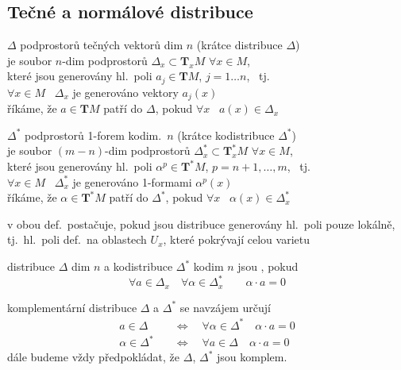 \subsection{Tečné a normálové distribuce}

\begin{definice}[Distribuce]
 $\Delta$ podprostorů tečných vektorů dim $n$ (krátce distribuce $\Delta$) \\
je soubor $n$-dim podprostorů $\Delta_x\subset\mathbf{T}_xM$ $\forall x\in M$, \\
které jsou generovány hl.\ poli $a_j\in\mathbf{T}M$, $j = 1\dots n$, \ tj.\ \\
\quad $\forall x\in M$ \ $\Delta_x$ je generováno vektory $a_j(x)$ \\
říkáme, že $a\in\mathbf{T}M$ patří do $\Delta$, pokud $\forall x$ \ $a(x)\in\Delta_x$
\end{definice}

\begin{definice}[Kodistribuce]
 $\Delta^*$ podprostorů 1-forem kodim.\ $n$ (krátce kodistribuce $\Delta^*$) \\
je soubor $(m-n)$-dim podprostorů $\Delta^*_x\subset\mathbf{T}^*_xM$ $\forall x\in M$, \\
které jsou generovány hl.\ poli $\alpha^{p}\in\mathbf{T}^*M$, $p = n+1,\dots,m$, \ tj.\ \\
\quad $\forall x\in M$ \ $\Delta^*_x$ je generováno 1-formami $\alpha^{p}(x)$ \\
říkáme, že $\alpha\in\mathbf{T}^*M$ patří do $\Delta^*$, pokud $\forall x$ \ $\alpha(x)\in\Delta^*_x$
\end{definice}
v obou def.\ postačuje, pokud jsou distribuce generovány hl.\ poli pouze lokálně, tj.\ hl.\ poli def.\ na oblastech $U_x$, které pokrývají celou varietu

\begin{definice}
distribuce $\Delta$ dim $n$ a kodistribuce $\Delta^*$ kodim $n$ jsou , pokud
\[
  \forall a\in\Delta_x \quad \forall\alpha\in\Delta^*_x \qquad \alpha\cdot a = 0
\]
\end{definice}
komplementární distribuce $\Delta$ a $\Delta^*$ se navzájem určují
\begin{align*}
  a\in\Delta &\quad\Leftrightarrow\quad \forall\alpha\in\Delta^* \quad \alpha\cdot a = 0 \\
  \alpha\in\Delta^* &\quad\Leftrightarrow\quad \forall a\in\Delta \quad \alpha\cdot a = 0
\end{align*}
dále budeme vždy předpokládat, že $\Delta$, $\Delta^*$ jsou komplem.

